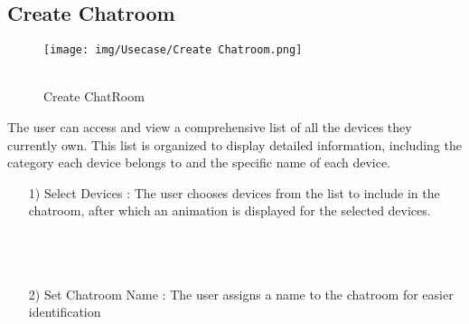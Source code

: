 \documentclass[conference]{IEEEtran}
\begin{document}
\subsection{Create Chatroom}
\begin{figure}[h]
\hspace{1.5cm}
\centering
\begin{minipage}{0.4\columnwidth}
    \texttt{[image: img/Usecase/Create Chatroom.png]}
    \caption{\\ Create ChatRoom}
\end{minipage}
\end{figure}
The user can access and view a comprehensive list of all the devices they currently own. This list is organized to display detailed information, including the category each device belongs to and the specific name of each device. \\  
\begin{enumerate}
    \begin{figure}[h]
\hspace{1.5cm}
\centering
\begin{minipage}{0.4\columnwidth}
    \texttt{[image: img/Usecase/Select Devices.png]}
    \caption{Select Devices}
\end{minipage}
\end{figure}
    \item [1)] Select Devices : The user chooses devices from the list to include in the chatroom, after which an animation is displayed for the selected devices. \\ \\ \\ \\
\end{enumerate}
\begin{enumerate}
    \begin{figure}[h]
\hspace{1.5cm}
\centering
\begin{minipage}{0.4\columnwidth}
    \texttt{[image: img/Usecase/Set Chatroom Name.png]}
    \caption{Set \\ Chatroom Name}
\end{minipage}
\end{figure}
    \item [2)] Set Chatroom Name : The user assigns a name to the chatroom for easier identification \\
\end{enumerate}
\end{document}
